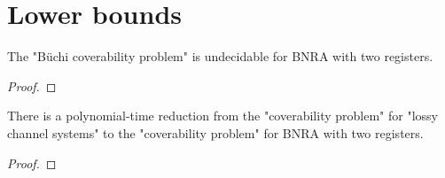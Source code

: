 \section{Lower bounds}

\begin{proposition}
	The "Büchi coverability problem" is undecidable for BNRA with two registers.
\end{proposition}

\begin{proof}
\end{proof}

\begin{proposition}
	There is a polynomial-time reduction from the "coverability problem" for "lossy channel systems" to the "coverability problem" for BNRA with two registers.
\end{proposition}

\begin{proof}
\end{proof}